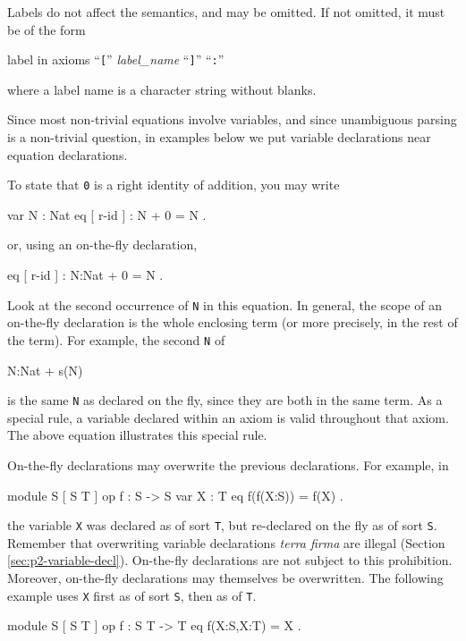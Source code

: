 \documentclass[a4paper]{memoir}
\begin{document}
Labels do not affect the semantics, and may be omitted. If not
omitted, it must be of the form

\begin{bsyntax} label in axioms \Hline
``\/\texttt{[}'' \textit{label\_name} ``\texttt{]}'' ``\texttt{:}''
\end{bsyntax}

where a label name is a character string without blanks.

Since most non-trivial equations involve variables, and since
unambiguous parsing is a non-trivial question, in examples below
we put variable declarations near equation declarations.

To state that \verb|0| is a right identity of addition, you may write
\begin{vvtm}
\begin{ccode}
  var N : Nat
  eq [ r-id ] : N + 0 = N .
\end{ccode}
\end{vvtm}
or, using an on-the-fly declaration,
\begin{vvtm}
\begin{ccode}
  eq [ r-id ] : N:Nat + 0 = N .
\end{ccode}
\end{vvtm}
Look at the second occurrence of \verb|N| in this equation. In general,
the scope of an on-the-fly declaration is the whole enclosing
term (or more precisely, in the rest of the term).
For example, the second \verb|N| of
\begin{vvtm}
\begin{ccode}
  N:Nat + s(N)
\end{ccode}
\end{vvtm}
is the same \verb|N| as declared on the fly, since
they are both in the same term. As a special rule, a variable
declared within an axiom is valid throughout that axiom. The
above equation illustrates this special rule.

On-the-fly declarations may overwrite the previous declarations.
For example, in
\begin{vvtm}
\begin{ccode}
  module S {
    [ S T ]
    op f : S -> S
    var X : T
    eq f(f(X:S)) = f(X) .
  }
\end{ccode}
\end{vvtm}
the variable \verb|X| was declared as of sort \verb|T|,
but re-declared on the fly as of sort \verb|S|. Remember that
overwriting variable declarations {\em terra firma} are illegal
(Section \ref{sec:p2-variable-decl}). On-the-fly declarations
are not subject to this prohibition. Moreover, on-the-fly
declarations may themselves be overwritten.
The following example uses \verb|X| first as of sort \verb|S|,
then as of \verb|T|.
\begin{vvtm}
\begin{ccode}
  module S {
    [ S T ]
    op f : S T -> T
    eq f(X:S,X:T) = X .
  }
\end{ccode}
\end{vvtm}
\end{document}
